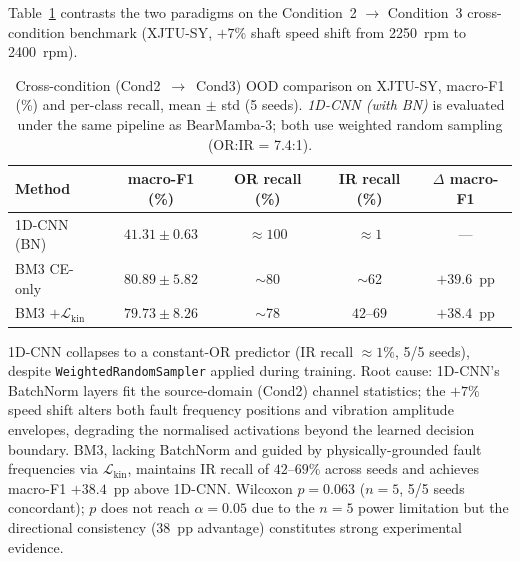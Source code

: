 Table~\ref{tab:ood_comparison} contrasts the two paradigms on the
Condition~2 $\to$ Condition~3 cross-condition benchmark (XJTU-SY,
$+7\%$ shaft speed shift from 2250~rpm to 2400~rpm).

\begin{table}[htbp]
\centering
\caption{Cross-condition (Cond2~$\to$~Cond3) OOD comparison on XJTU-SY,
         macro-F1 (\%) and per-class recall, mean $\pm$ std (5 seeds).
         \textit{1D-CNN (with BN)} is evaluated under the same pipeline
         as BearMamba-3; both use weighted random sampling (OR:IR = 7.4:1).}
\label{tab:ood_comparison}
\begin{tabular}{lcccc}
\toprule
Method & macro-F1 (\%) & OR recall (\%) & IR recall (\%) & $\Delta$ macro-F1 \\
\midrule
1D-CNN (BN)                       & $41.31 \pm 0.63$  & $\approx 100$ & $\approx 1$   & --- \\
BM3 CE-only                       & $80.89 \pm 5.82$  & $\sim$80      & $\sim$62      & $+39.6$~pp \\
BM3 $+\mathcal{L}_{\text{kin}}$   & $79.73 \pm 8.26$  & $\sim$78      & $42$--$69$    & $+38.4$~pp \\
\bottomrule
\end{tabular}
\begin{tablenotes}
\item 1D-CNN collapses to a constant-OR predictor (IR recall $\approx 1\%$,
  5/5 seeds), despite \texttt{WeightedRandomSampler} applied during training.
  Root cause: 1D-CNN's BatchNorm layers fit the source-domain (Cond2)
  channel statistics; the $+7\%$ speed shift alters both fault frequency
  positions and vibration amplitude envelopes, degrading the normalised
  activations beyond the learned decision boundary.
  BM3, lacking BatchNorm and guided by physically-grounded fault frequencies
  via $\mathcal{L}_{\text{kin}}$, maintains IR recall of $42$--$69\%$
  across seeds and achieves macro-F1 $+38.4$~pp above 1D-CNN.
  Wilcoxon $p = 0.063$ ($n=5$, 5/5 seeds concordant); $p$ does not reach
  $\alpha = 0.05$ due to the $n=5$ power limitation but the directional
  consistency (38~pp advantage) constitutes strong experimental evidence.
\end{tablenotes}
\end{table}

